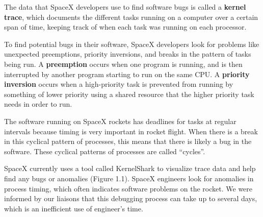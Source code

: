 \documentclass{hmcclinic}
\begin{document}
The data that SpaceX developers use to find software bugs is called
a {\bf kernel trace}, which documents the different tasks running on a computer over a
certain span of time, keeping track of when each task was running on each processor. 

To find potential bugs in their software, SpaceX developers look for
problems like unexpected preemptions, priority inversions, and breaks in the
pattern of tasks being run.
 A {\bf preemption} occurs when one program is running, and
is then interrupted by another program starting to run on the same CPU. 
A {\bf priority
inversion} occurs when a high-priority task is prevented from running by something of
lower priority using a shared resource that the higher priority task needs in
order to run. 

The software running on SpaceX rockets has deadlines for tasks at regular intervals because timing is very important in rocket flight. When there is a break in this cyclical pattern of processes, this means that there is likely a bug in the software. These cyclical patterns of processes are called ``cycles''.

SpaceX currently uses a tool called KernelShark %
to visualize trace data and help find any bugs or anomalies (Figure 1.1). 
SpaceX engineers look for anomalies in process timing, which often indicates 
software problems on the rocket. We were informed by our liaisons that this
 debugging process can take up to several days, 
which is an inefficient use of engineer's time. \\
\end{document}
